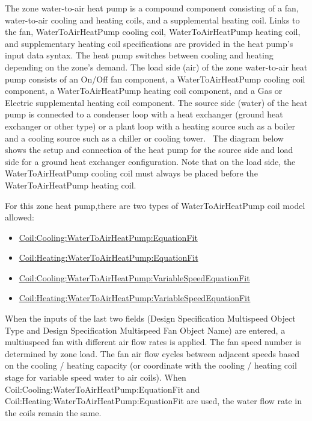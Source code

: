 The zone water-to-air heat pump is a compound component consisting of a fan, water-to-air cooling and heating coils, and a supplemental heating coil. Links to the fan, WaterToAirHeatPump cooling coil, WaterToAirHeatPump heating coil, and supplementary heating coil specifications are provided in the heat pump's input data syntax. The heat pump switches between cooling and heating depending on the zone's demand. The load side (air) of the zone water-to-air heat pump consists of an On/Off fan component, a WaterToAirHeatPump cooling coil component, a WaterToAirHeatPump heating coil component, and a Gas or Electric supplemental heating coil component. The source side (water) of the heat pump is connected to a condenser loop with a heat exchanger (ground heat exchanger or other type) or a plant loop with a heating source such as a boiler and a cooling source such as a chiller or cooling tower.~ The diagram below shows the setup and connection of the heat pump for the source side and load side for a ground heat exchanger configuration. Note that on the load side, the WaterToAirHeatPump cooling coil must always be placed before the WaterToAirHeatPump heating coil.

For this zone heat pump,there are two types of WaterToAirHeatPump coil model allowed:

\begin{itemize}
\item
  \hyperref[coilcoolingwatertoairheatpumpequationfit]{Coil:Cooling:WaterToAirHeatPump:EquationFit}
\item
  \hyperref[coilheatingwatertoairheatpumpequationfit]{Coil:Heating:WaterToAirHeatPump:EquationFit}
\item
  \hyperref[coilcoolingwatertoairheatpumpvariablespeedequationfit]{Coil:Cooling:WaterToAirHeat\hyperref[pumpvariablespeed]{Pump:VariableSpeed}EquationFit}
\item
  \hyperref[coilheatingwatertoairheatpumpvariablespeedequationfit]{Coil:Heating:WaterToAirHeat\hyperref[pumpvariablespeed]{Pump:VariableSpeed}EquationFit}
\end{itemize}

When the inputs of the last two fields (Design Specification Multispeed Object Type and Design Specification Multispeed Fan Object Name) are entered, a multiuspeed fan with different air flow rates is applied.  The fan speed number is determined by zone load. The fan air flow cycles between adjacent speeds based on the cooling / heating capacity (or coordinate with the cooling / heating coil stage for variable speed water to air coils). When Coil:Cooling:WaterToAirHeatPump:EquationFit and Coil:Heating:WaterToAirHeatPump:EquationFit are used, the water flow rate in the coils remain the same.


